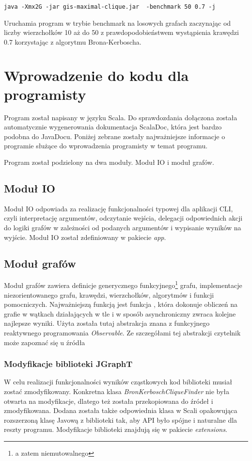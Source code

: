 \documentclass[12pt, a4paper]{article}
\begin{document}
\begin{verbatim}
java -Xmx2G -jar gis-maximal-clique.jar  -benchmark 50 0.7 -j
\end{verbatim}
Uruchamia program w trybie benchmark na losowych grafach zaczynając od liczby wierzchołków 10 aż do 50 z prawdopodobieństwem wystąpienia krawędzi 0.7 korzystając z algorytmu Brona-Kerboscha.

\section{Wprowadzenie do kodu dla programisty}
Program został napisany w języku Scala. Do sprawdozdania dołączona została automatycznie wygenerowania dokumentacja ScalaDoc, która jest bardzo podobna do JavaDocu. Poniżej zebrane zostały najważniejsze informacje o programie służące do wprowadzenia programisty w temat programu.

Program został podzielony na dwa moduły. Moduł IO i moduł grafów. 

\subsection{Moduł IO}
Moduł IO odpowiada za realizację funkcjonalności typowej dla aplikacji CLI, czyli interpretację argumentów, odczytanie wejścia, delegacji odpowiednich akcji do logiki grafów w zależności od podanych argumentów i wypisanie wyników na wyjście. Moduł IO został zdefiniowany w pakiecie \emph{app}.

\subsection{Moduł grafów}
Moduł grafów zawiera definicje generycznego funkcyjnego\footnote{a zatem niemutowalnego} grafu, implementacje niezorientowanego grafu, krawędzi, wierzchołków, algorytmów i funkcji pomocniczych. Najważniejszą funkcją jest funkcja , która dokonuje obliczeń na grafie w wątkach działających w tle i w sposób asynchroniczny zwraca kolejne najlepsze wyniki. Użyta została tutaj abstrakcja znana z funkcyjnego reaktywnego programowania \emph{Observable}. Ze szczegółami tej abstrakcji czytelnik może zapoznać się u źródła \cite{rx}

\subsubsection{Modyfikacje biblioteki JGraphT}
W celu realizacji funkcjonalności wyników cząstkowych kod biblioteki musiał zostać zmodyfikowany. Konkretna klasa \emph{BronKerboschCliqueFinder} nie była otwarta na modyfikacje, dlatego też została przekopiowana do źródeł i zmodyfikowana. Dodana została także odpowiednia klasa w Scali opakowująca rozszerzoną klasę Javową z biblioteki tak, aby API było spójne i naturalne dla reszty programu.
Modyfikacje biblioteki znajdują się w pakiecie \emph{extensions}.
\end{document}
